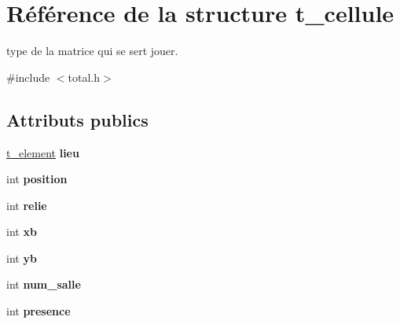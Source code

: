 \hypertarget{structt__cellule}{}\section{Référence de la structure t\+\_\+cellule}
\label{structt__cellule}


type de la matrice qui se sert jouer.  




{\ttfamily \#include $<$total.\+h$>$}

\subsection*{Attributs publics}
\begin{DoxyCompactItemize}
\item 
\hyperlink{total_8h_a8b071baf43ce73c99f88fc8169b0514d}{t\+\_\+element} {\bfseries lieu}\hypertarget{structt__cellule_acc90c92f8e818d09c854228459a0ab22}{}\label{structt__cellule_acc90c92f8e818d09c854228459a0ab22}

\item 
int {\bfseries position}\hypertarget{structt__cellule_a5e1ccabc00cb0d0408227098303c202f}{}\label{structt__cellule_a5e1ccabc00cb0d0408227098303c202f}

\item 
int {\bfseries relie}\hypertarget{structt__cellule_af9dbc60de1329863b1bae065e31fe8bf}{}\label{structt__cellule_af9dbc60de1329863b1bae065e31fe8bf}

\item 
int {\bfseries xb}\hypertarget{structt__cellule_a5183498db3cf4a0f5850dafd8bbb7247}{}\label{structt__cellule_a5183498db3cf4a0f5850dafd8bbb7247}

\item 
int {\bfseries yb}\hypertarget{structt__cellule_a3f76a3701e3261c07cd0ab76556f3d77}{}\label{structt__cellule_a3f76a3701e3261c07cd0ab76556f3d77}

\item 
int {\bfseries num\+\_\+salle}\hypertarget{structt__cellule_a2342d5f65d1caac334a6e32095992a64}{}\label{structt__cellule_a2342d5f65d1caac334a6e32095992a64}

\item 
int {\bfseries presence}\hypertarget{structt__cellule_abfd3c5804afeb49a5d11c20e0d3c38b9}{}\label{structt__cellule_abfd3c5804afeb49a5d11c20e0d3c38b9}

\end{DoxyCompactItemize}


